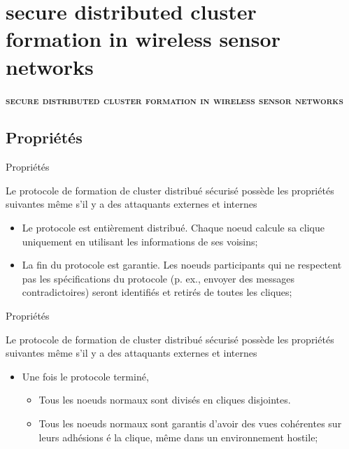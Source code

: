\documentclass[12pt, c]{beamer}
\begin{document}
\section{ secure distributed cluster formation in wireless sensor networks}	
			\begin{frame}{}
				\transfade
				\begin{center}
					\vspace{-0.2cm}
				\huge\textbf{ \textsc{ secure distributed cluster formation in wireless sensor networks}}
				\end{center}
			\end{frame}
			\subsection{Propriétés}
			\begin{frame}{Propriétés}
				\transwipe
				\vspace{-0.21cm}
					\begin{block}{\scriptsize Le protocole de formation de cluster distribué sécurisé possède les propriétés suivantes même s'il y a des attaquants externes et internes}
						\begin{itemize}
							\item[\ding{43}]Le protocole est entièrement distribué. Chaque noeud calcule sa clique uniquement en utilisant les informations de ses voisins;
							\item[\ding{43}] La fin du protocole est garantie. Les noeuds participants qui ne respectent pas les spécifications du protocole (p. ex., envoyer des messages contradictoires) seront identifiés et retirés de toutes les cliques;
						\end{itemize}
					\end{block}
					
			\end{frame}
			\begin{frame}{Propriétés}
				\transwipe
				\vspace{-0.21cm}
					\begin{block}{\scriptsize Le protocole de formation de cluster distribué sécurisé possède les propriétés suivantes même s'il y a des attaquants externes et internes}
						\begin{itemize}
						\item[\ding{43}] Une fois le protocole terminé,
						\begin{itemize}
										\item Tous les noeuds normaux sont divisés en cliques disjointes.
										\item  Tous les noeuds normaux sont garantis d'avoir des vues cohérentes sur leurs adhésions é la clique, même dans un environnement hostile;

									\end{itemize}
						\end{itemize}
					\end{block}
					
			\end{frame}
\end{document}
